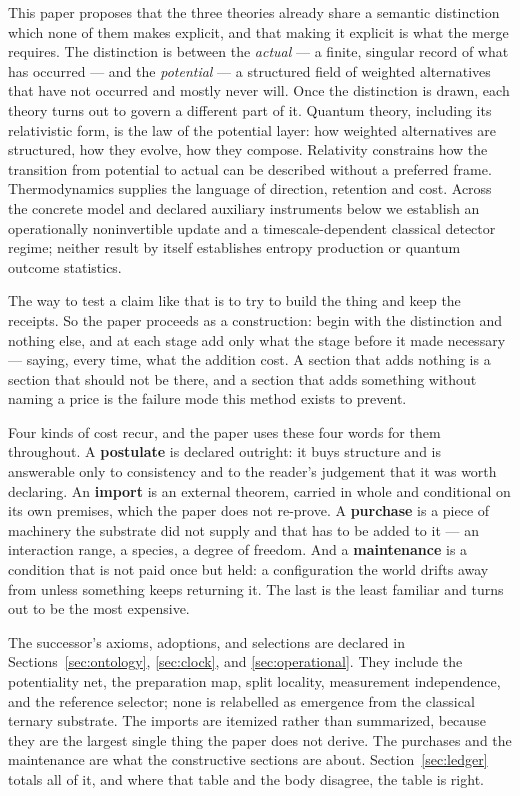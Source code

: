 \documentclass[11pt,a4paper]{article}
\theoremstyle{definition}
\theoremstyle{plain}
\theoremstyle{remark}
\begin{document}
This paper proposes that the three theories already share a semantic
distinction which none of them makes explicit, and that making it
explicit is what the merge requires. The distinction is between the
\emph{actual} --- a finite, singular record of what has occurred --- and
the \emph{potential} --- a structured field of weighted alternatives that
have not occurred and mostly never will. Once the distinction is drawn,
each theory turns out to govern a different part of it. Quantum theory,
including its relativistic form, is the law of the potential layer: how
weighted alternatives are structured, how they evolve, how they compose.
Relativity constrains how the transition from potential to actual can be
described without a preferred frame. Thermodynamics supplies the language
of direction, retention and cost. Across the concrete model and declared
auxiliary instruments below we establish an operationally noninvertible
update and a timescale-dependent classical detector regime; neither result
by itself establishes entropy production or quantum outcome statistics.

The way to test a claim like that is to try to build the thing and keep
the receipts. So the paper proceeds as a construction: begin with the
distinction and nothing else, and at each stage add only what the stage
before it made necessary --- saying, every time, what the addition cost.
A section that adds nothing is a section that should not be there, and a
section that adds something without naming a price is the failure mode
this method exists to prevent.

Four kinds of cost recur, and the paper uses these four words for them
throughout. A \textbf{postulate} is declared outright: it buys structure
and is answerable only to consistency and to the reader's judgement that
it was worth declaring. An \textbf{import} is an external theorem,
carried in whole and conditional on its own premises, which the paper
does not re-prove. A \textbf{purchase} is a piece of machinery the
substrate did not supply and that has to be added to it --- an
interaction range, a species, a degree of freedom. And a
\textbf{maintenance} is a condition that is not paid once but held: a
configuration the world drifts away from unless something keeps
returning it. The last is the least familiar and turns out to be the most
expensive.

The successor's axioms, adoptions, and selections are declared in
Sections~\ref{sec:ontology}, \ref{sec:clock}, and
\ref{sec:operational}. They include the potentiality net, the preparation
map, split locality, measurement independence, and the reference selector;
none is relabelled as emergence from the classical ternary substrate. The
imports are itemized rather than summarized,
because they are the largest single thing the paper does not derive. The
purchases and the maintenance are what the constructive sections are
about. Section~\ref{sec:ledger} totals all of it, and where that table and
the body disagree, the table is right.
\end{document}
